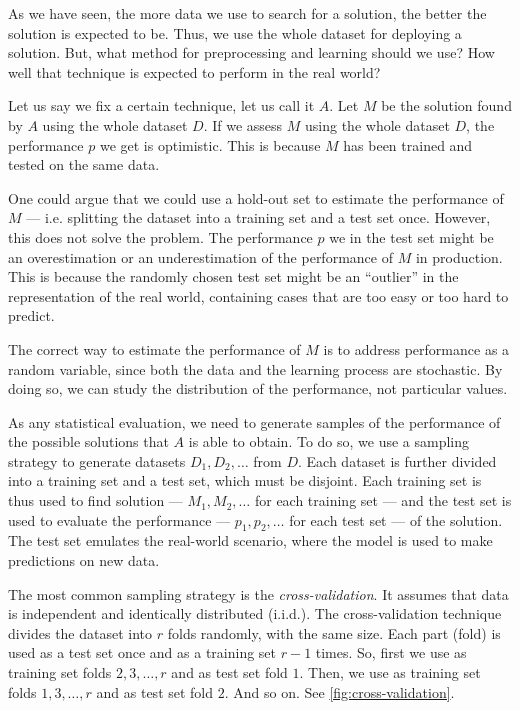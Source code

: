 As we have seen, the more data we use to search for a solution, the better the solution is
expected to be.  Thus, we use the whole dataset for deploying a solution.  But, what
method for preprocessing and learning should we use?  How well that technique is
expected to perform in the real world?

Let us say we fix a certain technique, let us call it $A$.  Let $M$ be the solution found
by $A$ using the whole dataset $D$.  If we assess $M$ using the whole dataset $D$, the
performance $p$ we get is optimistic.  This is because $M$ has been trained and tested
on the same data.

One could argue that we could use a hold-out set to estimate the performance of $M$ ---
i.e. splitting the dataset into a training set and a test set once.  However, this does
not solve the problem.  The performance $p$ we in the test set might be an overestimation
or an underestimation of the performance of $M$ in production.  This is because the
randomly chosen test set might be an ``outlier'' in the representation of the real world,
containing cases that are too easy or too hard to predict.

The correct way to estimate the performance of $M$ is to address performance as a
random variable, since both the data and the learning process are stochastic.
By doing so, we can study the distribution of the performance, not particular values.

As any statistical evaluation, we need to generate samples
of the performance of the possible solutions that $A$ is able to obtain. To do so, we use
a sampling strategy to generate datasets $D_1, D_2, \ldots$ from $D$.  Each
dataset is further divided into a training set and a test set, which must be disjoint.
Each training set is thus used to find solution --- $M_1, M_2, \ldots$ for each
training set --- and the test set is used to evaluate the performance --- $p_1, p_2,
\ldots$ for each test set --- of the solution.  The test set emulates the real-world
scenario, where the model is used to make predictions on new data.

The most common sampling strategy is the \emph{cross-validation}.  It assumes that data is
independent and identically distributed (i.i.d.).  The cross-validation technique divides
the dataset into $r$ folds randomly, with the same size.  Each part (fold) is used as a
test set once and as a training set $r-1$ times.  So, first we use as training set folds
$2, 3, \ldots, r$ and as test set fold $1$.  Then, we use as training set folds $1, 3,
\ldots, r$ and as test set fold $2$. And so on.  See \cref{fig:cross-validation}.

